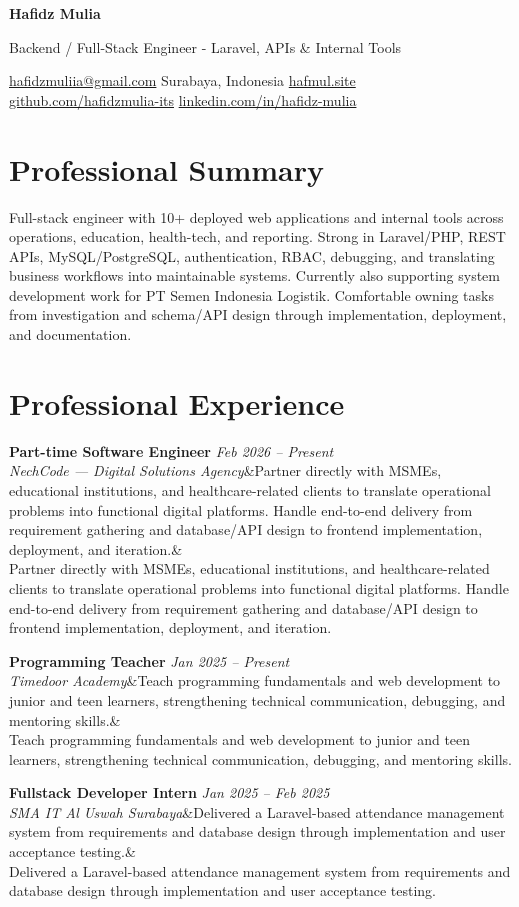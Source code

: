 \documentclass[a4paper,10.5pt]{article}
\newcommand{\cvname}[1]{{\centering\LARGE\bfseries #1\par\vspace{1pt}}}
\newcommand{\cvtitle}[1]{{\centering\normalsize\color{accent} #1\par\vspace{2pt}}}
\newcommand{\cvcontact}[1]{{\centering\small #1\par\vspace{4pt}}}
\newcommand{\cventry}[4]{\noindent\textbf{#1} \hfill \textit{#3} \\\textit{#2}\ifx&#4& \else \\ {\small #4} \fi\vspace{4pt}}
\begin{document}
\cvname{Hafidz Mulia}
\cvtitle{Backend / Full-Stack Engineer - Laravel, APIs \& Internal Tools}
\cvcontact{\href{mailto:hafidzmuliia@gmail.com}{hafidzmuliia@gmail.com} \quad\textbar\quad Surabaya, Indonesia \quad\textbar\quad \href{https://hafmul.site}{hafmul.site} \\
\href{https://github.com/hafidzmulia-its}{github.com/hafidzmulia-its} \quad\textbar\quad \href{https://www.linkedin.com/in/hafidz-mulia/}{linkedin.com/in/hafidz-mulia}}

\section{Professional Summary}
Full-stack engineer with 10+ deployed web applications and internal tools across operations, education, health-tech, and reporting. Strong in Laravel/PHP, REST APIs, MySQL/PostgreSQL, authentication, RBAC, debugging, and translating business workflows into maintainable systems. Currently also supporting system development work for PT Semen Indonesia Logistik. Comfortable owning tasks from investigation and schema/API design through implementation, deployment, and documentation.

\section{Professional Experience}
\cventry
  {Part-time Software Engineer}
  {NechCode --- Digital Solutions Agency}
  {Feb 2026 -- Present}
  {Partner directly with MSMEs, educational institutions, and healthcare-related clients to translate operational problems into functional digital platforms. Handle end-to-end delivery from requirement gathering and database/API design to frontend implementation, deployment, and iteration.}

\cventry
  {Programming Teacher}
  {Timedoor Academy}
  {Jan 2025 -- Present}
  {Teach programming fundamentals and web development to junior and teen learners, strengthening technical communication, debugging, and mentoring skills.}

\cventry
  {Fullstack Developer Intern}
  {SMA IT Al Uswah Surabaya}
  {Jan 2025 -- Feb 2025}
  {Delivered a Laravel-based attendance management system from requirements and database design through implementation and user acceptance testing.}
\end{document}
